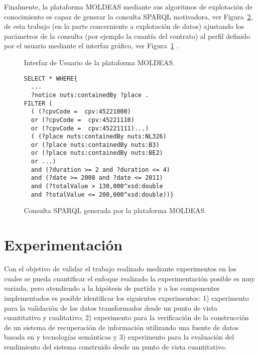 \documentclass[a4paper,final,11pt,fleqn,twoside]{book}  %
\begin{document}
Finalmente, la plataforma MOLDEAS mediante sus algoritmos de explotación de conocimiento es capaz de generar la consulta SPARQL 
motivadora, ver Figura~\ref{figure:expanded}, de esta trabajo (en la parte concerniente a explotación de datos) ajustando los parámetros de la consulta (por ejemplo 
la cuantía del contrato) al perfil definido por el usuario mediante el interfaz gráfico, ver Figura~\ref{fig:moldeas-web} .

\begin{figure}[!htb]
\centering
\caption{Interfaz de Usuario de la plataforma MOLDEAS.}
\label{fig:moldeas-web}
\end{figure}



 \begin{figure}[!ht] 
\begin{center}
\begin{lstlisting}[language=SPARQL]
SELECT * WHERE{
  ...
  ?notice nuts:containedBy ?place .
FILTER (  
  ( (?cpvCode =  cpv:45221000) 
  or (?cpvCode =  cpv:45221110) 
  or (?cpvCode =  cpv:45221111)...)
  ( (?place nuts:containedBy nuts:NL326) 
  or (?place nuts:containedBy nuts:B3) 
  or (?place nuts:containedBy nuts:BE2) 
  or ...) 
  and (?duration >= 2 and ?duration <= 4) 
  and (?date >= 2008 and ?date <= 2011) 
  and (?totalValue > 130,000^xsd:double 
  and ?totalValue <= 200,000^xsd:double))}
\end{lstlisting}
\caption{Consulta SPARQL generada por la plataforma MOLDEAS.}
\label{figure:expanded}
\end{center}
\end{figure}


\chapter{Experimentación}
Con el objetivo de validar el trabajo realizado mediante experimentos en los cuales se pueda cuantificar el 
enfoque realizado la experimentación posible es muy variada, pero atendiendo  a la hipótesis de partida y a 
los componentes implementados es posible identificar los siguientes experimentos: 1) experimento para la validación de los datos 
transformados desde un punto de vista cuantitativo y cualitativo; 2) experimento para la verificación de la construcción de 
un sistema de recuperación de información utilizando una fuente de datos basada en \linkeddata y tecnologías semánticas y 3) 
experimento para la evaluación del rendimiento del sistema construido desde un punto de vista cuantitativo.
\end{document}
